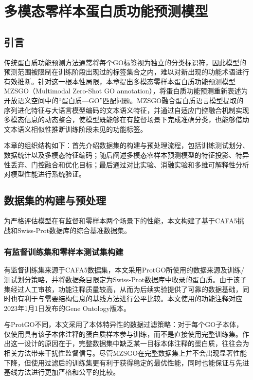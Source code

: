 
\chapter{多模态零样本蛋白质功能预测模型}

\section{引言}

传统蛋白质功能预测方法通常将每个GO标签视为独立的分类标识符，因此模型的预测范围被限制在训练阶段出现过的标签集合之内，难以对新出现的功能术语进行有效推断。针对这一根本性局限，本章提出多模态零样本蛋白质功能预测模型MZSGO（Multimodal Zero-Shot GO annotation），将蛋白质功能预测重新表述为开放语义空间中的“蛋白质—GO”匹配问题。MZSGO融合蛋白质语言模型提取的序列进化特征与大语言模型编码的文本语义特征，并通过自适应门控融合机制实现多模态信息的动态整合，使模型既能够在有监督场景下完成准确分类，也能够借助文本语义相似性推断训练阶段未见的功能标签。

本章的组织结构如下：首先介绍数据集的构建与预处理流程，包括训练测试划分、数据统计以及多模态特征编码；随后阐述多模态零样本预测模型的特征投影、特异性丢弃、门控融合和优化目标；最后通过对比实验、消融实验和多维可解释性分析对模型性能进行系统验证。

\section{数据集的构建与预处理}\label{sec:mzsgo_datasets}

为严格评估模型在有监督和零样本两个场景下的性能，本文构建了基于CAFA5挑战和Swiss-Prot数据库\cite{boutet2007uniprotkb}的综合基准数据集。

\subsection{有监督训练集和零样本测试集构建}

有监督训练集来源于CAFA5数据集，本文采用ProtGO\cite{wang2025protgo}所使用的数据来源及训练/测试划分策略，并将数据条目限定为Swiss-Prot数据库中收录的蛋白质。由于该子集经过人工审核，功能注释质量较高，从而为后续实验提供了可靠的数据基础，同时也有利于与需要结构信息的基线方法进行公平比较。本文使用的功能注释对应2023年1月1日发布的Gene Ontology版本。

与ProtGO不同，本文采用了本体特异性的数据过滤策略：对于每个GO子本体，仅使用具有该子本体注释的蛋白质样本参与训练，而不是直接使用完整训练集。作出这一设计的原因在于，完整数据集中缺乏某一目标本体注释的蛋白质，往往会为相关方法带来干扰性监督信号。尽管MZSGO在完整数据集上并不会出现显著性能下降，但使用过滤后的训练集更有利于获得稳定的最优性能，同时也能保证与先进基线方法进行更加严格和公平的比较。

